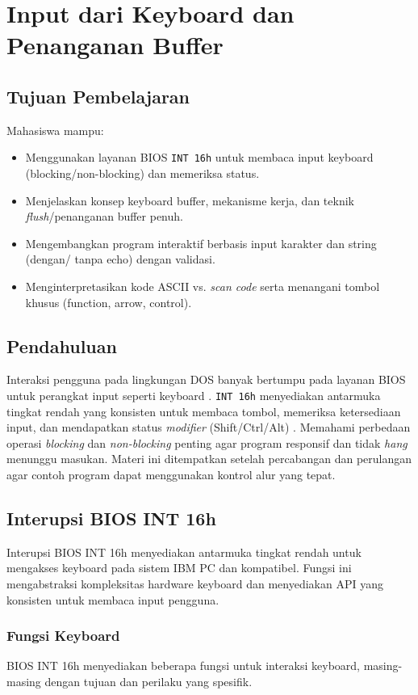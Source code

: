 \documentclass[../main.tex]{subfiles}
\begin{document}
\chapter{Input dari Keyboard dan Penanganan Buffer}

\section{Tujuan Pembelajaran}
Mahasiswa mampu:
\begin{itemize}
    \item Menggunakan layanan BIOS \texttt{INT 16h} untuk membaca input keyboard (blocking/non-blocking) dan memeriksa status.
    \item Menjelaskan konsep keyboard buffer, mekanisme kerja, dan teknik \textit{flush}/penanganan buffer penuh.
    \item Mengembangkan program interaktif berbasis input karakter dan string (dengan/ tanpa echo) dengan validasi.
    \item Menginterpretasikan kode ASCII vs. \textit{scan code} serta menangani tombol khusus (function, arrow, control).
\end{itemize}

\section{Pendahuluan}
Interaksi pengguna pada lingkungan DOS banyak bertumpu pada layanan BIOS untuk perangkat input seperti keyboard \cite{rbil}. \texttt{INT 16h} menyediakan antarmuka tingkat rendah yang konsisten untuk membaca tombol, memeriksa ketersediaan input, dan mendapatkan status \textit{modifier} (Shift/Ctrl/Alt) \cite{osdev_wiki}. Memahami perbedaan operasi \textit{blocking} dan \textit{non-blocking} penting agar program responsif dan tidak \textit{hang} menunggu masukan. Materi ini ditempatkan setelah percabangan dan perulangan agar contoh program dapat menggunakan kontrol alur yang tepat.

\section{Interupsi BIOS INT 16h}
        Interupsi BIOS INT 16h menyediakan antarmuka tingkat rendah untuk mengakses keyboard pada sistem IBM PC dan kompatibel. Fungsi ini mengabstraksi kompleksitas hardware keyboard dan menyediakan API yang konsisten untuk membaca input pengguna.

\subsection{Fungsi Keyboard}
            BIOS INT 16h menyediakan beberapa fungsi untuk interaksi keyboard, masing-masing dengan tujuan dan perilaku yang spesifik.
\end{document}
